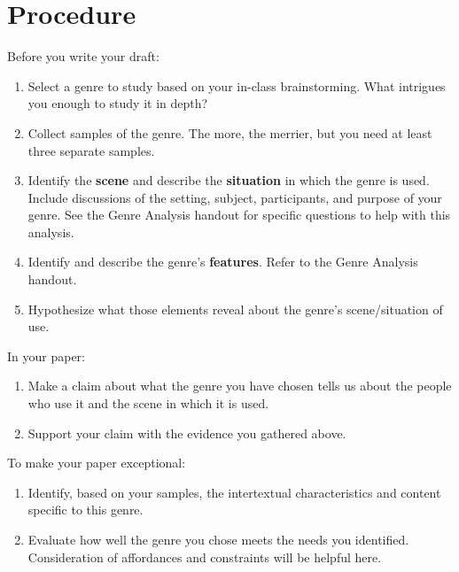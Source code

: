 \documentclass[10pt, oneside, twocolumn]{amsart}	%
\begin{document}
\section{Procedure} %
\label{sec:procedure}
\noindent Before you write your draft:
		\begin{enumerate}
			\item Select a genre to study based on your in-class brainstorming. What intrigues you enough to study it in depth?
			\item Collect samples of the genre. The more, the merrier, but you need at least three separate samples.
			\item Identify the \textbf{scene} and describe the \textbf{situation} in which the genre is used. Include discussions of the setting, subject, participants, and purpose of your genre. See the Genre Analysis handout for specific questions to help with this analysis.
			\item Identify and describe the genre's \textbf{features}. Refer to the Genre Analysis handout.
			\item Hypothesize what those elements reveal about the genre's scene/situation of use.
		\end{enumerate}
In your paper:
		\begin{enumerate}
			\item Make a claim about what the genre you have chosen tells us about the people who use it and the scene in which it is used.
			\item Support your claim with the evidence you gathered above.
		\end{enumerate}
To make your paper exceptional:
		\begin{enumerate}
			\item Identify, based on your samples, the intertextual characteristics and content specific to this genre.
			\item Evaluate how well the genre you chose meets the needs you identified. Consideration of affordances and constraints will be helpful here.
		\end{enumerate}
\end{document}
